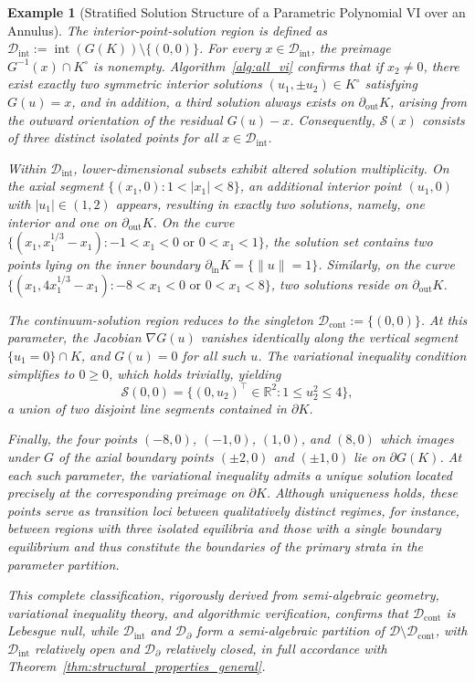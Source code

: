 \documentclass[sn-basic,Numbered]{sn-jnl}
\theoremstyle{thmstyleone}%
\newtheorem{example}{Example}%
\begin{document}
\begin{example}[Stratified Solution Structure of a Parametric Polynomial VI over an Annulus]
The interior-point-solution region is defined as $\mathcal{D}_{\mathrm{int}} := \operatorname{int}(G(K)) \setminus \{(0,0)\}$. For every $x \in \mathcal{D}_{\mathrm{int}}$, the preimage $G^{-1}(x) \cap K^\circ$ is nonempty. Algorithm~\ref{alg:all_vi} confirms that if $x_2 \neq 0$, there exist exactly two symmetric interior solutions $(u_1, \pm u_2) \in K^\circ$ satisfying $G(u) = x$, and in addition, a third solution always exists on $\partial_{\mathrm{out}} K$, arising from the outward orientation of the residual $G(u) - x$. Consequently, $\mathcal{S}(x)$ consists of three distinct isolated points for all $x \in \mathcal{D}_{\mathrm{int}}$.

Within $\mathcal{D}_{\mathrm{int}}$, lower-dimensional subsets exhibit altered solution multiplicity. On the axial segment $\{(x_1, 0) : 1 < |x_1| < 8\}$, an additional interior point $(u_1, 0)$ with $|u_1| \in (1,2)$ appears, resulting in exactly two solutions, namely, one interior and one on $\partial_{\mathrm{out}} K$. On the curve $\{(x_1, x_1^{1/3} - x_1) : -1 < x_1 < 0 \text{ or } 0 < x_1 < 1\}$, the solution set contains two points lying on the inner boundary $\partial_{\mathrm{in}} K = \{ \|u\| = 1 \}$. Similarly, on the curve $\{(x_1, 4x_1^{1/3} - x_1) : -8 < x_1 < 0 \text{ or } 0 < x_1 < 8\}$, two solutions reside on $\partial_{\mathrm{out}} K$.

The continuum-solution region reduces to the singleton $\mathcal{D}_{\mathrm{cont}} := \{(0,0)\}$. At this parameter, the Jacobian $\nabla G(u)$ vanishes identically along the vertical segment $\{u_1 = 0\} \cap K$, and $G(u) = 0$ for all such $u$. The variational inequality condition simplifies to $0 \geq 0$, which holds trivially, yielding
\[
\mathcal{S}(0,0) = \{ (0, u_2)^\top \in \mathbb{R}^2 : 1 \leq u_2^2 \leq 4 \},
\]
a union of two disjoint line segments contained in $\partial K$.

Finally, the four points $(-8,0)$, $(-1,0)$, $(1,0)$, and $(8,0)$ which images under $G$ of the axial boundary points $(\pm2,0)$ and $(\pm1,0)$ lie on $\partial G(K)$. At each such parameter, the variational inequality admits a unique solution located precisely at the corresponding preimage on $\partial K$. Although uniqueness holds, these points serve as transition loci between qualitatively distinct regimes, for instance, between regions with three isolated equilibria and those with a single boundary equilibrium and thus constitute the boundaries of the primary strata in the parameter partition.

This complete classification, rigorously derived from semi-algebraic geometry, variational inequality theory, and algorithmic verification, confirms that $\mathcal{D}_{\mathrm{cont}}$ is Lebesgue null, while $\mathcal{D}_{\mathrm{int}}$ and $\mathcal{D}_{\partial}$ form a semi-algebraic partition of $\mathcal{D} \setminus \mathcal{D}_{\mathrm{cont}}$, with $\mathcal{D}_{\mathrm{int}}$ relatively open and $\mathcal{D}_{\partial}$ relatively closed, in full accordance with Theorem~\ref{thm:structural_properties_general}.

\end{example}
\end{document}
